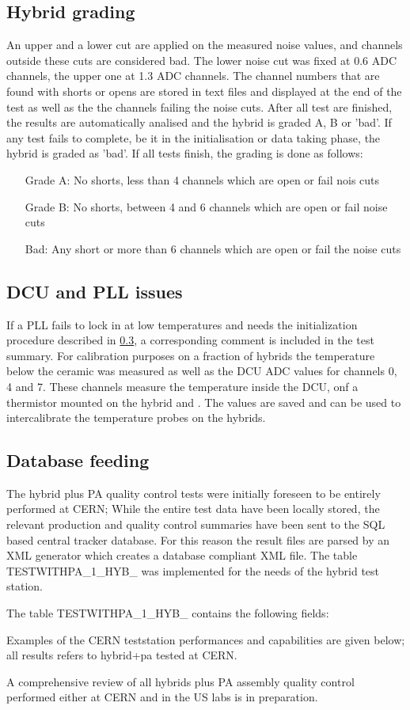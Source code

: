 \subsection{Hybrid grading}
An upper and a lower cut are applied on the measured noise values, and channels outside these cuts are considered bad.
The lower noise cut was fixed at 0.6 ADC channels, the upper one at 1.3 ADC channels.
The channel numbers that are found with shorts or opens are stored in text files and displayed at the end of the test as well as the the channels failing the noise cuts.
After all test are finished, the results are automatically analised and the hybrid is graded A, B or 'bad'.
If any test fails to complete, be it in the initialisation or data taking phase, the hybrid is graded as 'bad'.
If all tests finish, the grading is done as follows:
\begin{itemize}
\item[Grade A:] No shorts, less than 4 channels which are open or fail nois cuts
\item[Grade B:] No shorts, between 4 and 6 channels which are open or fail noise cuts
\item[Bad:] Any short or more than 6 channels which are open or fail the noise cuts
\end{itemize}

\subsection{DCU and PLL issues}
If a PLL fails to lock in at low temperatures and needs the initialization procedure described in \ref{}, a corresponding comment is included in the test summary.
For calibration purposes on a fraction of hybrids the temperature below the ceramic was measured as well as the DCU ADC values for channels 0, 4 and 7. These channels measure the temperature inside the DCU, onf a thermistor mounted on the hybrid and \fixme. The values are saved and can be used to intercalibrate the temperature probes on the hybrids.

\subsection{Database feeding}
The hybrid plus PA quality control tests were initially foreseen to be entirely performed at CERN;
While the entire test data have been locally stored, the relevant production and quality control summaries have been sent to the SQL based central tracker database. For this reason the result files are parsed by an XML generator which creates a database compliant XML file. The table TESTWITHPA\_1\_HYB\_ was implemented for the needs of the hybrid test station.

The table TESTWITHPA\_1\_HYB\_ contains the following fields:


Examples of the CERN teststation performances and capabilities are given below; all results refers to hybrid+pa tested at CERN.

A comprehensive review of all hybrids plus PA assembly quality control  performed either at CERN and in the US labs is in preparation.

